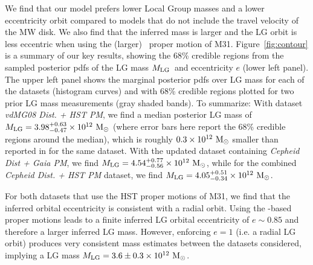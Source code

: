 \documentclass[twocolumn]{aastex631}
\newcommand{\mlg}{\ensuremath{M_{\rm LG}}}
\begin{document}
We find that our model prefers lower Local Group masses and a lower eccentricity
orbit compared to models that do not include the travel velocity of the MW disk.
We also find that the inferred mass is larger and the LG orbit is less eccentric
when using the (larger) \gaia\ proper motion of M31.
Figure~\ref{fig:contour} is a summary of our key results, showing the 68\%
credible regions from the sampled posterior pdfs of the LG mass \mlg\ and
eccentricity $e$ (lower left panel).
The upper left panel shows the marginal posterior pdfs over LG mass for each of
the datasets (histogram curves) and with 68\% credible regions plotted for two
prior LG mass measurements (gray shaded bands).
To summarize: With dataset \textit{vdMG08 Dist. + HST PM}, we find a
median posterior LG mass of $\mlg = 3.98 ^{+0.63}_{-0.47}\times10^{12}~\Msun$
(where error
bars here report the 68\% credible regions around the median), which is
roughly $0.3\times 10^{12}~\mathrm{M}_\odot$ smaller than reported in \cite{vdm2012} for
the same dataset.
With the updated dataset containing \textit{Cepheid Dist + Gaia PM}, we find
$\mlg = 4.54 ^{+0.77}_{-0.56}\times10^{12}~\Msun$, while for the combined
 \textit{Cepheid Dist. + HST PM} dataset, we find
 $\mlg = 4.05^{+0.51}_{-0.34}\times 10^{12}~\Msun$.

For both datasets that use the HST proper motions of M31, we
find that the inferred orbital eccentricity is consistent with a radial orbit.
Using the \gaia-based proper motions \citep{Salomon2021} leads to a finite
inferred LG orbital eccentricity of $e\sim 0.85$ and therefore a larger inferred
LG mass.
However, enforcing $e=1$ (i.e. a radial LG orbit) produces very consistent mass
estimates between the datasets considered, implying a LG mass $\mlg = 3.6
\pm 0.3 \times 10^{12}~\Msun$.
\end{document}
